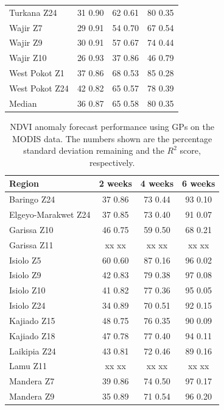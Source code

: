 \documentclass[review]{elsarticle}
\begin{document}
\begin{table}
\begin{tabular}{l|ccc}
		Turkana Z24 & 31 	0.90 &	62 	0.61 &	80 	0.35 		 \\
		Wajir Z7 & 29 	0.91&54 	0.70 &	67 	0.54 		\\
		Wajir Z9 & 30 	0.91 &57 	0.67 &	74 	0.44 			\\
		Wajir Z10& 26 	0.93 &37 	0.86&46 	0.79 		\\
		West Pokot Z1 & 37 	0.86 &	68 	0.53& 85 	0.28	\\
		West Pokot Z24 & 42 	0.82&	65 	0.57 &	78 	0.39 		\\
		\bottomrule
		Median & 36 0.87 & 65 0.58 & 80 0.35 \\
		\bottomrule
	\end{tabular}
\end{table}


\begin{table}
	\footnotesize
	\caption{NDVI anomaly forecast performance using GPs on the MODIS data. The numbers shown are the percentage standard deviation remaining and the $R^2$ score, respectively.} \label{tab:NDVI_GPM}
	\centering
	\begin{tabular}{l|ccc} 
		\toprule
		\textbf{Region}  &  \textbf{2 weeks} &  \textbf{4 weeks}  & \textbf{6 weeks}  \\
		\midrule
		Baringo Z24 & 37 0.86 & 73 0.44 & 93 0.10 \\
		Elgeyo-Marakwet Z24 & 37 0.85 & 73 0.40 & 91 0.07 \\
		Garissa Z10 & 46 0.75 & 59 0.50 & 68 0.21 \\
		Garissa Z11 & xx xx & xx xx & xx xx \\
		Isiolo Z5 & 60 0.60 & 87 0.16 & 96 0.02 \\
		Isiolo Z9 & 42 0.83 & 79 0.38 & 97 0.08 \\
		Isiolo Z10 & 41 0.82 & 77 0.36 & 95 0.05 \\
		Isiolo Z24 & 34 0.89 & 70 0.51 & 92 0.15 \\
		Kajiado Z15 & 48 0.75 & 76 0.35 & 90 0.09 \\
		Kajiado Z18 & 47 0.78 & 77 0.40 & 94 0.11 \\
		Laikipia Z24 & 43 0.81 & 72 0.46 & 89 0.16 \\
		Lamu Z11 & xx xx & xx xx & xx xx\\
		Mandera Z7 & 39 0.86 & 74 0.50 & 97 0.17 \\
		Mandera Z9 & 35 0.89 & 71 0.54 & 96 0.20 \\

\end{tabular}
\end{table}
\end{document}
